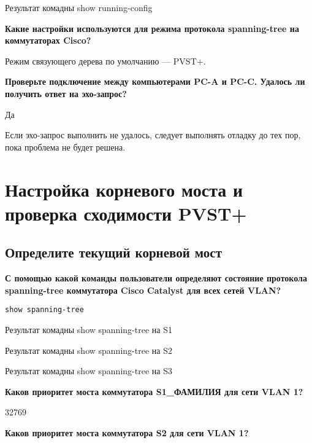 \begin{image}
	\caption{Результат комадны show running-config}
\end{image}

\textbf{Какие настройки используются для режима протокола spanning-tree
	на коммутаторах Cisco?}

Режим связующего дерева по умолчанию --- PVST+.

\textbf{Проверьте подключение между компьютерами PC-A и PC-C.
	Удалось ли получить ответ на эхо-запрос?}

Да

Если эхо-запрос выполнить не удалось, следует выполнять отладку до тех пор,
пока проблема не будет решена.

\section{Настройка корневого моста и проверка сходимости PVST+}
\subsection{Определите текущий корневой мост}

\textbf{С помощью какой команды пользователи определяют состояние
протокола spanning-tree коммутатора Cisco Catalyst для всех сетей VLAN?}

\begin{verbatim}
show spanning-tree
\end{verbatim}

\begin{image}
	\caption{Результат комадны show spanning-tree на S1}
\end{image}

\begin{image}
	\caption{Результат комадны show spanning-tree на S2}
\end{image}

\begin{image}
	\caption{Результат комадны show spanning-tree на S3}
\end{image}

\textbf{Каков приоритет моста коммутатора S1\_ФАМИЛИЯ для сети VLAN 1?}

32769

\textbf{Каков приоритет моста коммутатора S2 для сети VLAN 1?}

